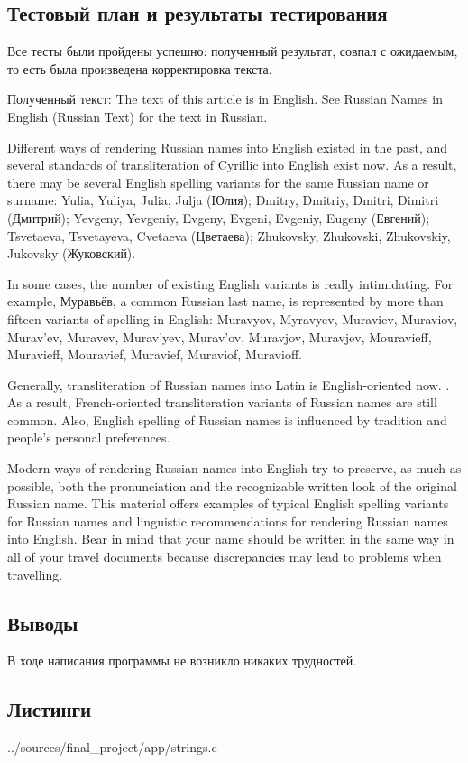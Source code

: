 \documentclass[12pt,a4paper]{report}
\begin{document}
\subsection{Тестовый план и результаты тестирования}
Все тесты были пройдены успешно: полученный результат, совпал с ожидаемым, то есть была произведена корректировка текста.

Полученный текст:
The text of this article is in English. 
   See Russian Names in English (Russian Text) for the text in Russian.
 
Different ways of rendering Russian names into English existed in the past, and several standards of transliteration of Cyrillic into English exist now. As a result, there may be several English spelling variants for the same Russian name or surname: Yulia, Yuliya, Julia, Julja (Юлия); Dmitry, Dmitriy, Dmitri, Dimitri (Дмитрий); Yevgeny, Yevgeniy, Evgeny, Evgeni, Evgeniy, Eugeny (Евгений); Tsvetaeva, Tsvetayeva, Cvetaeva (Цветаева); Zhukovsky, Zhukovski, Zhukovskiy, Jukovsky (Жуковский).
 
In some cases, the number 
   of existing English 
   variants is really intimidating. For example,  Муравьёв, a common Russian last name, is represented by more than fifteen variants of spelling in English: Muravyov, Myravyev, Muraviev, Muraviov, Murav'ev, Muravev, Murav'yev, Murav'ov, Muravjov, Muravjev, Mouravieff, Muravieff, Mouravief, Muravief, Muraviof, Muravioff.
 
Generally,  transliteration of Russian names into Latin is English-oriented now. . As a result, French-oriented transliteration variants of Russian names are still common. Also, English spelling of Russian names is influenced by tradition and people's personal preferences.
 
Modern ways of rendering Russian names into English 
   try to preserve, as much as possible, both the pronunciation and the recognizable written look of the original Russian name. This material offers examples of typical English spelling variants for Russian names and linguistic recommendations for rendering Russian names into English. Bear in mind that your name should be written in the same way in all of your travel documents because discrepancies may lead to problems when travelling.
\subsection{Выводы}
В ходе написания программы не возникло никаких трудностей.
\subsection*{Листинги}

{../sources/final_project/app/strings.c}
\end{document}
